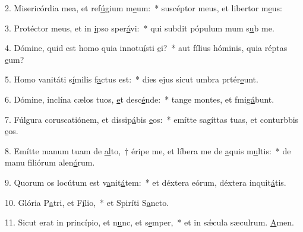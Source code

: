 2. Misericórdia mea, et ref\uline{ú}gium m\uline{e}um:~* suscéptor meus, et libertor m\uline{e}us:\par 
3. Protéctor meus, et in \uline{i}pso sper\uline{á}vi:~* qui subdit pópulum mum s\uline{u}b me.\par 
4. Dómine, quid est homo quia innotu\uline{í}sti \uline{e}i?~* aut fílius hóminis, quia réptas \uline{e}um?\par 
5. Homo vanitáti s\uline{í}milis f\uline{a}ctus est:~* dies ejus sicut umbra prtér\uline{e}unt.\par 
6. Dómine, inclína cælos tuos, \uline{e}t desc\uline{é}nde:~* tange montes, et fmig\uline{á}bunt.\par 
7. Fúlgura coruscatiónem, et dissip\uline{á}bis \uline{e}os:~* emítte sagíttas tuas, et conturbbis \uline{e}os.\par 
8. Emítte manum tuam de \uline{al}to,~† éripe me, et líbera me de \uline{a}quis m\uline{u}ltis:~* de manu filiórum alen\uline{ó}rum.\par 
9. Quorum os locútum est v\uline{a}nit\uline{á}tem:~* et déxtera eórum, déxtera inquit\uline{á}tis.\par 
10. Glória P\uline{a}tri, et F\uline{í}lio,~* et Spiríti S\uline{a}ncto.\par 
11. Sicut erat in princípio, et n\uline{u}nc, et s\uline{e}mper,~* et in sǽcula sæculrum. \uline{A}men.\par 
